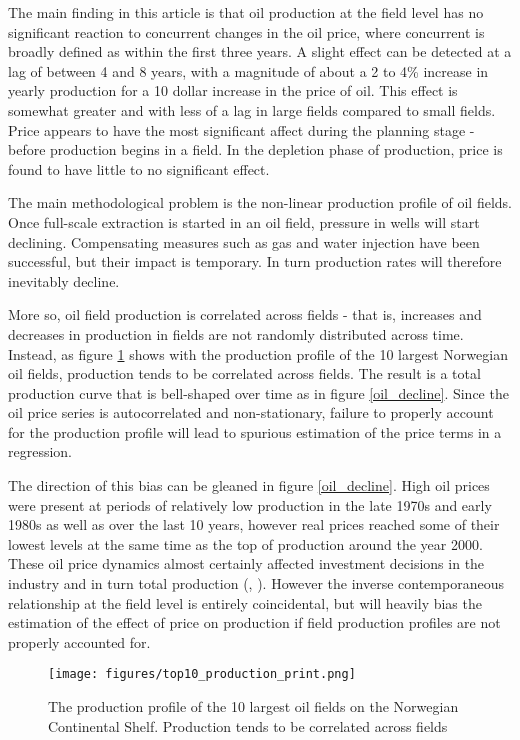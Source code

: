 \documentclass[12pt]{article}
\begin{document}
The main finding in this article is that oil production at the field level has no significant reaction to concurrent changes in the oil price, where concurrent is broadly defined as within the first three years.  A slight effect can be detected at a lag of between 4 and 8 years, with a magnitude of about a 2 to 4\% increase in yearly production for a 10 dollar increase in the price of oil.  This effect is somewhat greater and with less of a lag in large fields compared to small fields.  Price appears to have the most significant affect during the planning stage - before production begins in a field.  In the depletion phase of production, price is found to have little to no significant effect.  

The main methodological problem is the non-linear production profile of oil fields.  Once full-scale extraction is started in an oil field, pressure in wells will start declining. Compensating measures such as gas and water injection have been successful, but their impact is temporary. In turn production rates will therefore inevitably decline.

More so, oil field production is correlated across fields - that is, increases and decreases in production in fields are not randomly distributed across time.  Instead, as figure \ref{top10_production} shows with the production profile of the 10 largest Norwegian oil fields, production tends to be correlated across fields.  The result is a total production curve that is bell-shaped over time as in figure \ref{oil_decline}.  Since the oil price series is autocorrelated and non-stationary, failure to properly account for the production profile will lead to spurious estimation of the price terms in a regression.

The direction of this bias can be gleaned in figure \ref{oil_decline}.  High oil prices were present at periods of relatively low production in the late 1970s and early 1980s as well as over the last 10 years, however real prices reached some of their lowest levels at the same time as the top of production around the year 2000. These oil price dynamics almost certainly affected investment decisions in the industry and in turn total production (\citep{osmundsen_is_2007}, \citep{aune_financial_2010}). However the inverse contemporaneous relationship at the field level is entirely coincidental, but will heavily bias the estimation of the effect of price on production if field production profiles are not properly accounted for. 

\begin{figure}
	\texttt{[image: figures/top10\_production\_print.png]}
	\caption{The production profile of the 10 largest oil fields on the Norwegian Continental Shelf.  Production tends to be correlated across fields}
	\label{top10_production}	
	\end{figure}
\end{document}
